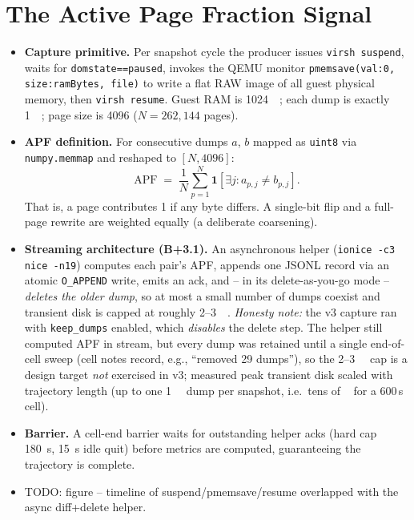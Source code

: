 \documentclass[conference]{IEEEtran}
\begin{document}
\section{The Active Page Fraction Signal}
\begin{itemize}
  \item \textbf{Capture primitive.} Per snapshot cycle the producer issues
        \texttt{virsh suspend}, waits for \texttt{domstate==paused}, invokes the
        QEMU monitor \texttt{pmemsave(val:0, size:ramBytes, file)} to write a
        flat RAW image of all guest physical memory, then \texttt{virsh resume}.
        Guest RAM is \SI{1024}{\mebi\byte}; each dump is exactly \SI{1}{\gibi\byte};
        page size is \SI{4096}{\byte} ($N = 262{,}144$ pages).
  \item \textbf{APF definition.} For consecutive dumps $a$, $b$ mapped as
        \texttt{uint8} via \texttt{numpy.memmap} and reshaped to
        $[N, 4096]$:
        \[
          \mathrm{APF} \;=\; \frac{1}{N}\sum_{p=1}^{N}
          \mathbf{1}\!\left[\exists j: a_{p,j} \neq b_{p,j}\right].
        \]
        That is, a page contributes 1 if any byte differs. A single-bit flip and
        a full-page rewrite are weighted equally (a deliberate coarsening).
  \item \textbf{Streaming architecture (B+3.1).} An asynchronous helper
        (\texttt{ionice -c3 nice -n19}) computes each pair's APF, appends one
        JSONL record via an atomic \texttt{O\_APPEND} write, emits an ack, and
        -- in its delete-as-you-go mode -- \emph{deletes the older dump}, so at
        most a small number of dumps coexist and transient disk is capped at
        roughly \SI{2}{}--\SI{3}{\gibi\byte}. \emph{Honesty note:} the v3
        capture ran with \texttt{keep\_dumps} enabled, which \emph{disables} the
        delete step. The helper still computed APF in stream, but every dump was
        retained until a single end-of-cell sweep (cell notes record, e.g.,
        ``removed 29 dumps''), so the \SI{2}{}--\SI{3}{\gibi\byte} cap is a
        design target \emph{not} exercised in v3; measured peak transient disk
        scaled with trajectory length (up to one \SI{1}{\gibi\byte} dump per
        snapshot, i.e.\ tens of \si{\gibi\byte} for a 600\,s cell).
  \item \textbf{Barrier.} A cell-end barrier waits for outstanding helper acks
        (hard cap \SI{180}{\second}, \SI{15}{\second} idle quit) before metrics
        are computed, guaranteeing the trajectory is complete.
  \item TODO: figure -- timeline of suspend/pmemsave/resume overlapped with the
        async diff+delete helper.
\end{itemize}
\end{document}
